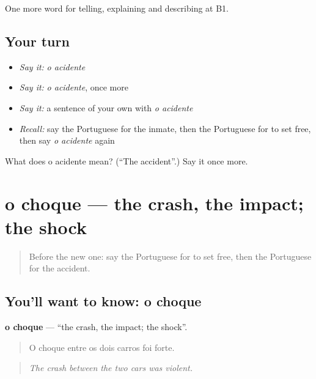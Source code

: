 \begin{grammarlens}[title={What you've built}]
One more word for telling, explaining and describing at B1.
\end{grammarlens}

\subsection*{Your turn}
\begin{itemize}
\raggedright
  \item \emph{Say it:} \emph{o acidente}
  \item \emph{Say it:} \emph{o acidente}, once more
  \item \emph{Say it:} a sentence of your own with \emph{o acidente}
  \item \emph{Recall:} say the Portuguese for the inmate, then the Portuguese for to set free, then say \emph{o acidente} again
\end{itemize}

\begin{tcolorbox}[breakable,colback=teal!4,colframe=teal!35!black,title={Before you move on}]
What does o acidente mean? (\textquotedblleft{}The accident\textquotedblright{}.) Say it once more.
\end{tcolorbox}
\section[o choque]{o choque — the crash, the impact; the shock}

\label{lesson:PT-C299-choque}



\begin{quote}
Before the new one: say the Portuguese for to set free, then the Portuguese for the accident.
\end{quote}

\subsection*{You'll want to know: o choque}
\textbf{o choque} — \textquotedblleft{}the crash, the impact; the shock\textquotedblright{}.

\begin{quote}
O choque entre os dois carros foi forte.
\end{quote}

\begin{quote}
\emph{The crash between the two cars was violent.}
\end{quote}

